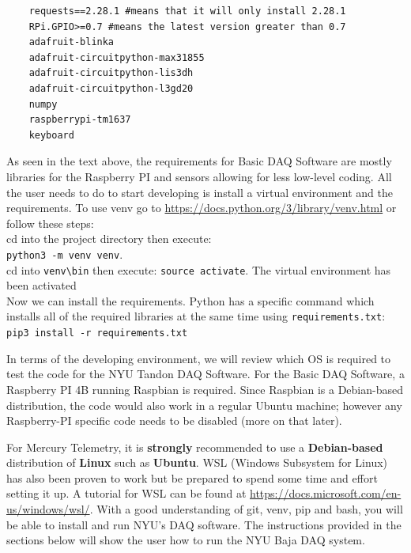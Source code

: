 \documentclass[12pt, letterpaper]{article}
\begin{document}
\begin{verbatim}
	requests==2.28.1 #means that it will only install 2.28.1
	RPi.GPIO>=0.7 #means the latest version greater than 0.7
	adafruit-blinka
	adafruit-circuitpython-max31855
	adafruit-circuitpython-lis3dh
	adafruit-circuitpython-l3gd20
	numpy
	raspberrypi-tm1637
	keyboard
\end{verbatim}

\par As seen in the text above, the requirements for Basic DAQ Software are mostly libraries for the Raspberry PI and sensors allowing for less low-level coding. All the user needs to do to start developing is install a virtual environment and the requirements. To use venv go to \url{https://docs.python.org/3/library/venv.html} or follow these steps: \\[1\baselineskip]

\noindent cd into the project directory then execute: \\
\texttt{python3 -m venv venv}.\\[1\baselineskip]

\noindent cd into \texttt{venv\textbackslash bin} then execute:
\texttt{source activate}. The virtual environment has been activated \\[1\baselineskip]

\noindent Now we can install the requirements. Python has a specific command which installs all of the required libraries at the same time using \texttt{requirements.txt}: \\[1\baselineskip]

\texttt{pip3 install -r requirements.txt} \\[1\baselineskip]


\par In terms of the developing environment, we will review which OS is required to test the code for the NYU Tandon DAQ Software. For the Basic DAQ Software, a Raspberry PI 4B running Raspbian is required. Since Raspbian is a Debian-based distribution, the code would also work in a regular Ubuntu machine; however any Raspberry-PI specific code needs to be disabled (more on that later). 

\par For Mercury Telemetry, it is \textbf{strongly} recommended to use a \textbf{Debian-based} distribution of \textbf{Linux} such as \textbf{Ubuntu}. WSL (Windows Subsystem for Linux) has also been proven to work but be prepared to spend some time and effort setting it up. A tutorial for WSL can be found at \url{https://docs.microsoft.com/en-us/windows/wsl/}. With a good understanding of git, venv, pip and bash, you will be able to install and run NYU's DAQ software. The instructions provided in the sections below will show the user how to run the NYU Baja DAQ system.
\end{document}
